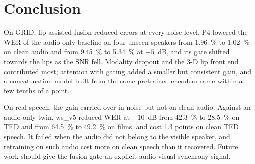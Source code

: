 \section{Conclusion}
\label{sec:conclusion}

On GRID, lip-assisted fusion reduced errors at every noise level. P4 lowered the WER of the
audio-only baseline on four unseen speakers from 1.96~\% to 1.02~\% on clean audio and from
9.45~\% to 5.34~\% at $-5$~dB, and its gate shifted towards the lips as the SNR fell. Modality
dropout and the 3-D lip front end contributed most; attention with gating added a smaller but
consistent gain, and a concatenation model built from the same pretrained encoders came within a few
tenths of a point.

On real speech, the gain carried over in noise but not on clean audio. Against an audio-only twin,
ws\_v5 reduced WER at $-10$~dB from 42.3~\% to 28.5~\% on TED and from 64.5~\% to 49.2~\% on films,
and cost 1.3 points on clean TED speech. It failed when the audio did not belong to the visible
speaker, and retraining on such audio cost more on clean speech than it recovered. Future work
should give the fusion gate an explicit audio-visual synchrony signal.
